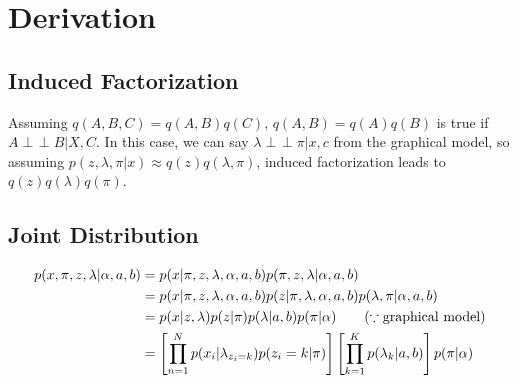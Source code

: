 \documentclass[a4paper,10.5pt,dvipdfmx]{jarticle}  %
\newcommand{\indep}{\mathop{\perp\!\!\!\!\perp}}
\begin{document}
\section{Derivation}
\subsection{Induced Factorization}
Assuming $q(A,B,C) = q(A,B) q(C)$, $q(A,B) = q(A)q(B)$ is true if $A \indep B | X, C$. In this case, we can say $\lambda \indep \pi | x, c$ from the graphical model, so assuming $p(z, \lambda, \pi | x) \approx q(z) q(\lambda, \pi)$, induced factorization leads to $q(z) q(\lambda) q(\pi)$.

\subsection{Joint Distribution}
\begin{align}
	p(x, \pi, z, \lambda| \alpha, a, b) &= p(x| \pi, z, \lambda, \alpha ,a, b) p(\pi, z, \lambda | \alpha, a,b)\\
&= p(x| \pi, z, \lambda, \alpha ,a, b) p(z| \pi, \lambda, \alpha, a, b) p(\lambda, \pi | \alpha, a, b)\\
&= p(x | z, \lambda) p(z | \pi) p(\lambda | a, b) p(\pi | \alpha) \qquad {\rm (\because graphical\ model)}\\
&= \left[ \prod_{n=1}^{N} p(x_i | \lambda_{z_i=k}) p(z_i = k | \pi)  \right] \left[ \prod_{k=1}^{K} p(\lambda_k| a,b)  \right]   p(\pi | \alpha) 
\end{align}
\end{document}
